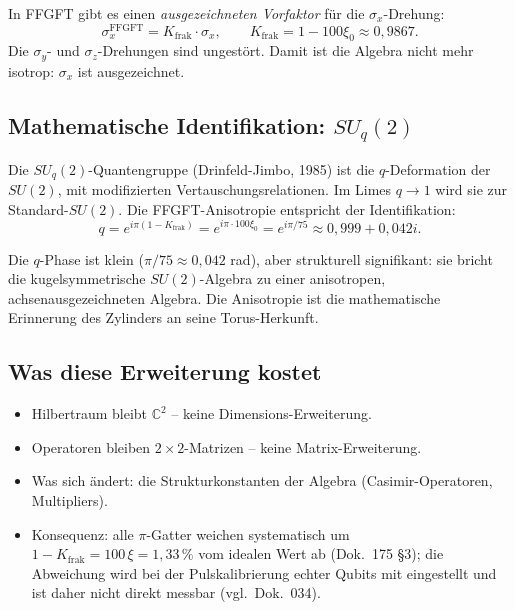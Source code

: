 In FFGFT gibt es einen \emph{ausgezeichneten Vorfaktor} für die
$\sigma_x$-Drehung:
\begin{equation}
  \sigma_x^{\text{FFGFT}} = K_{\text{frak}} \cdot \sigma_x,
  \qquad
  K_{\text{frak}} = 1 - 100\xi_0 \approx 0{,}9867.
\end{equation}
Die $\sigma_y$- und $\sigma_z$-Drehungen sind ungestört. Damit ist
die Algebra nicht mehr isotrop: $\sigma_x$ ist ausgezeichnet.

\subsection{Mathematische Identifikation: $SU_q(2)$}

Die $SU_q(2)$-Quantengruppe (Drinfeld-Jimbo, 1985) ist die
$q$-Deformation der $SU(2)$, mit modifizierten Vertauschungsrelationen.
Im Limes $q \to 1$ wird sie zur Standard-$SU(2)$. Die FFGFT-Anisotropie
entspricht der Identifikation:
\begin{equation}
  \boxed{
    q = e^{i\pi(1 - K_{\text{frak}})}
      = e^{i\pi \cdot 100\xi_0}
      = e^{i\pi/75}
      \approx 0{,}999 + 0{,}042i.
  }
\end{equation}

Die $q$-Phase ist klein ($\pi/75 \approx 0{,}042$ rad), aber
strukturell signifikant: sie bricht die kugelsymmetrische
$SU(2)$-Algebra zu einer anisotropen, achsenausgezeichneten Algebra.
Die Anisotropie ist die mathematische Erinnerung des Zylinders an
seine Torus-Herkunft.

\subsection{Was diese Erweiterung kostet}

\begin{itemize}[leftmargin=2em,itemsep=2pt,topsep=2pt]
  \item Hilbertraum bleibt $\mathbb{C}^2$ -- keine Dimensions-Erweiterung.
  \item Operatoren bleiben $2\times 2$-Matrizen -- keine
        Matrix-Erweiterung.
  \item Was sich ändert: die Strukturkonstanten der Algebra
        (Casimir-Operatoren, Multipliers).
  \item Konsequenz: alle $\pi$-Gatter weichen systematisch um
        $1 - K_{\text{frak}} = 100\,\xi = 1{,}33\,\%$ vom idealen Wert ab
        (Dok.~175 §3); die Abweichung wird bei der Pulskalibrierung
        echter Qubits mit eingestellt und ist daher nicht direkt
        messbar (vgl.\ Dok.~034).
\end{itemize}

